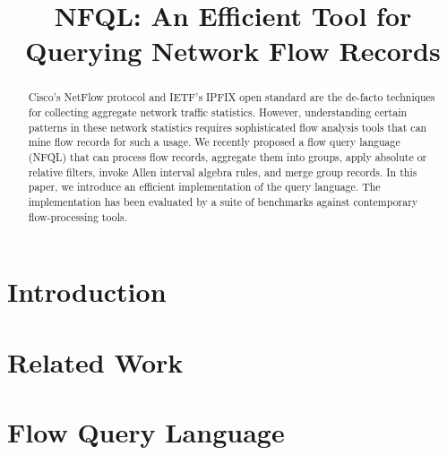 \documentclass[10pt, conference]{IEEEtran}
\begin{document}
\title{NFQL: An Efficient Tool for Querying Network Flow Records}
\author{ }

\maketitle

\begin{acronym}
\end{acronym}


\begin{abstract} Cisco's NetFlow protocol and IETF's IPFIX open standard are
  the de-facto techniques for collecting aggregate network traffic statistics.
  However, understanding certain patterns in these network statistics requires
  sophisticated flow analysis tools that can mine flow records for such a
  usage. We recently proposed a flow query language (NFQL) that can process
  flow records, aggregate them into groups, apply absolute or relative
  filters, invoke Allen interval algebra rules, and merge group records. In
  this paper, we introduce an efficient implementation of the query language.
  The implementation has been evaluated by a suite of benchmarks against
  contemporary flow-processing tools.\end{abstract}



\section{Introduction}
\label{sec:introduction}
\section{Related Work}
\label{sec:relatedwork}
\section{Flow Query Language}
\label{sec:design}
\end{document}
